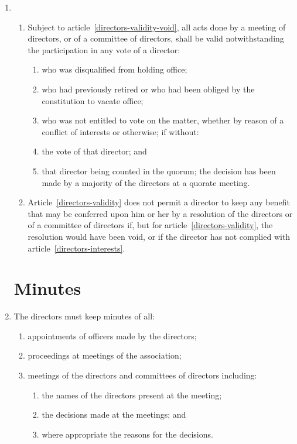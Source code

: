 \begin{enumerate}
\item
  \begin{enumerate}
  \item\label{directors-validity}
    Subject to article~\ref{directors-validity-void}, all acts done by a meeting of directors,
    or of a committee of directors, shall be valid notwithstanding the
    participation in any vote of a director:
    \begin{enumerate}
    \item
      who was disqualified from holding office;
    \item
      who had previously retired or who had been obliged by the
      constitution to vacate office;
    \item
      who was not entitled to vote on the matter, whether by reason of a
      conflict of interests or otherwise; if without:
    \item
      the vote of that director; and
    \item
      that director being counted in the quorum; the decision has been
      made by a majority of the directors at a quorate meeting.
    \end{enumerate}
  \item\label{directors-validity-void}
    Article~\ref{directors-validity} does not permit a director to
    keep any benefit that may be conferred upon him or her by a
    resolution of the directors or of a committee of directors if, but
    for article~\ref{directors-validity}, the resolution would have been void, or if the
    director has not complied with article~\ref{directors-interests}.
  \end{enumerate}

\section{Minutes}

\item
The directors must keep minutes of all:
    \begin{enumerate}
        \item
            appointments of officers made by the directors;
        \item
            proceedings at meetings of the association;
        \item
            meetings of the directors and committees of directors including:
            \begin{enumerate}
                \item
                    the names of the directors present at the meeting;
                \item
                    the decisions made at the meetings; and
                \item
                    where appropriate the reasons for the decisions.
            \end{enumerate}
    \end{enumerate}



\end{enumerate}
